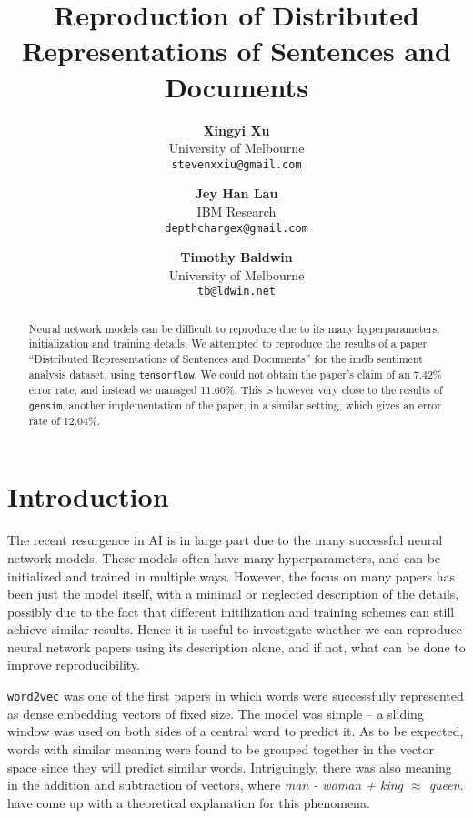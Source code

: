 \documentclass{article}
\begin{document}
\title{Reproduction of Distributed Representations of Sentences and Documents}

\author{
  \textbf{Xingyi Xu} \\ University of Melbourne \\ \texttt{stevenxxiu@gmail.com} \and
  \textbf{Jey Han Lau} \\ IBM Research \\ \texttt{depthchargex@gmail.com} \and
  \textbf{Timothy Baldwin} \\ University of Melbourne \\ \texttt{tb@ldwin.net}
}
\maketitle

\begin{abstract}
Neural network models can be difficult to reproduce due to its many hyperparameters, initialization and training details. We attempted to reproduce the results of a paper ``Distributed Representations of Sentences and Documents'' for the imdb sentiment analysis dataset, using \texttt{tensorflow}. We could not obtain the paper's claim of an 7.42\% error rate, and instead we managed 11.60\%. This is however very close to the results of \texttt{gensim}, another implementation of the paper, in a similar setting, which gives an error rate of 12.04\%.
\end{abstract}

\section{Introduction}
The recent resurgence in AI is in large part due to the many successful neural network models. These models often have many hyperparameters, and can be initialized and trained in multiple ways. However, the focus on many papers has been just the model itself, with a minimal or neglected description of the details, possibly due to the fact that different initilization and training schemes can still achieve similar results. Hence it is useful to investigate whether we can reproduce neural network papers using its description alone, and if not, what can be done to improve reproducibility.

\texttt{word2vec} \citep{mikolov_distributed_2013} was one of the first papers in which words were successfully represented as dense embedding vectors of fixed size. The model was simple -- a sliding window was used on both sides of a central word to predict it. As to be expected, words with similar meaning were found to be grouped together in the vector space since they will predict similar words. Intriguingly, there was also meaning in the addition and subtraction of vectors, where \textit{man - woman + king $\approx$ queen}. \cite{arora_rand-walk:_2015} have come up with a theoretical explanation for this phenomena.
\end{document}
